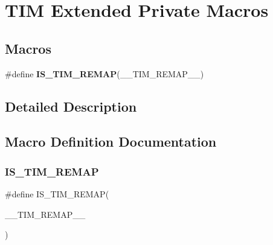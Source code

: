 \hypertarget{group___t_i_m_ex___private___macros}{}\section{T\+IM Extended Private Macros}
\label{group___t_i_m_ex___private___macros}
\subsection*{Macros}
\begin{DoxyCompactItemize}
\item 
\#define {\bfseries I\+S\+\_\+\+T\+I\+M\+\_\+\+R\+E\+M\+AP}(\+\_\+\+\_\+\+T\+I\+M\+\_\+\+R\+E\+M\+A\+P\+\_\+\+\_\+)
\end{DoxyCompactItemize}


\subsection{Detailed Description}


\subsection{Macro Definition Documentation}
\mbox{\label{group___t_i_m_ex___private___macros_gae20934eeb45adb08c627f651afbee60d}} 
\subsubsection{\texorpdfstring{IS\_TIM\_REMAP}{IS\_TIM\_REMAP}}
{\footnotesize\ttfamily \#define I\+S\+\_\+\+T\+I\+M\+\_\+\+R\+E\+M\+AP(\begin{DoxyParamCaption}\item[{}]{\+\_\+\+\_\+\+T\+I\+M\+\_\+\+R\+E\+M\+A\+P\+\_\+\+\_\+ }\end{DoxyParamCaption})}

